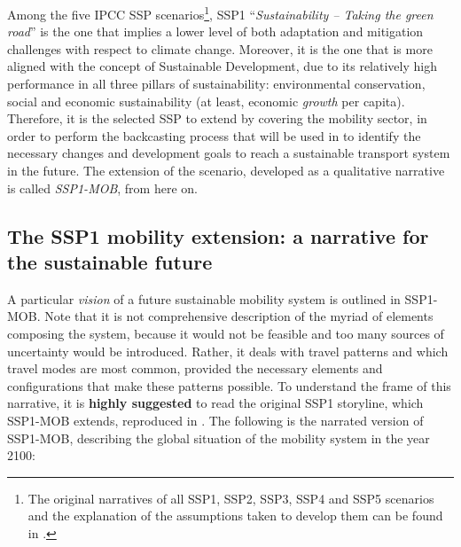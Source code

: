 Among the five IPCC \gls{SSP} scenarios\footnote{The original narratives of all SSP1, SSP2, SSP3, SSP4 and SSP5 scenarios and the explanation of the assumptions taken to develop them can be found in \textcite{oneill2017_roadsaheadNarratives}.}, SSP1 ``\textit{Sustainability -- Taking the green road}'' is the one that implies a lower level of both adaptation and mitigation challenges with respect to climate change. Moreover, it is the one that is more aligned with the concept of Sustainable Development, due to its relatively high performance in all three pillars of sustainability: environmental conservation, social and economic sustainability (at least, economic \emph{growth} per capita). Therefore, it is the selected SSP to extend by covering the mobility sector, in order to perform the backcasting process that will be used in  to identify the necessary changes and development goals to reach a sustainable transport system in the future. The extension of the scenario, developed as a qualitative narrative is called \emph{SSP1-MOB}, from here on.

\subsection[The SSP1 mobility extension]{The SSP1 mobility extension: a narrative for the sustainable future}
\label{ss:results:ssp1-mob-development}
A particular \emph{vision} of a future sustainable mobility system is outlined in SSP1-MOB. Note that it is not comprehensive description of the myriad of elements composing the system, because it would not be feasible and too many sources of uncertainty would be introduced. Rather, it deals with travel patterns and which travel modes are most common, provided the necessary elements and configurations that make these patterns possible. To understand the frame of this narrative, it is \textbf{highly suggested} to read the original SSP1 storyline, which SSP1-MOB extends, reproduced in . The following is the narrated version of SSP1-MOB, describing the global situation of the mobility system in the year 2100:

